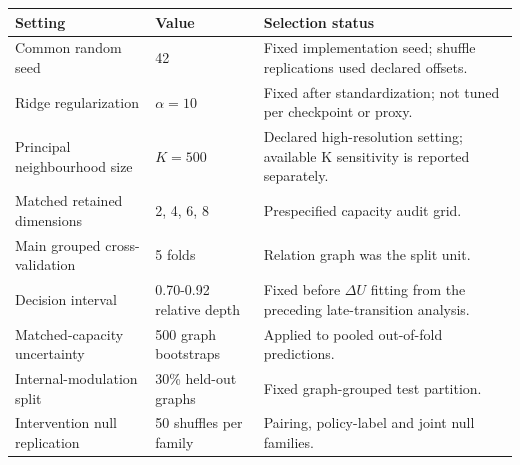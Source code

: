 \documentclass[11pt]{article}
\begin{document}
\begin{table}[H]
\centering\scriptsize\sloppy
\begin{tabularx}{\textwidth}{@{}XXX@{}}
\toprule
Setting & Value & Selection status \\
\midrule
Common random seed & 42 & Fixed implementation seed; shuffle replications used declared offsets. \\
Ridge regularization & \(\alpha=10\) & Fixed after standardization; not tuned per checkpoint or proxy. \\
Principal neighbourhood size & \(K=500\) & Declared high-resolution setting; available K sensitivity is reported separately. \\
Matched retained dimensions & 2, 4, 6, 8 & Prespecified capacity audit grid. \\
Main grouped cross-validation & 5 folds & Relation graph was the split unit. \\
Decision interval & 0.70-0.92 relative depth & Fixed before \(\Delta U\) fitting from the preceding late-transition analysis. \\
Matched-capacity uncertainty & 500 graph bootstraps & Applied to pooled out-of-fold predictions. \\
Internal-modulation split & 30\% held-out graphs & Fixed graph-grouped test partition. \\
Intervention null replication & 50 shuffles per family & Pairing, policy-label and joint null families. \\
\bottomrule
\end{tabularx}
\end{table}
\end{document}

